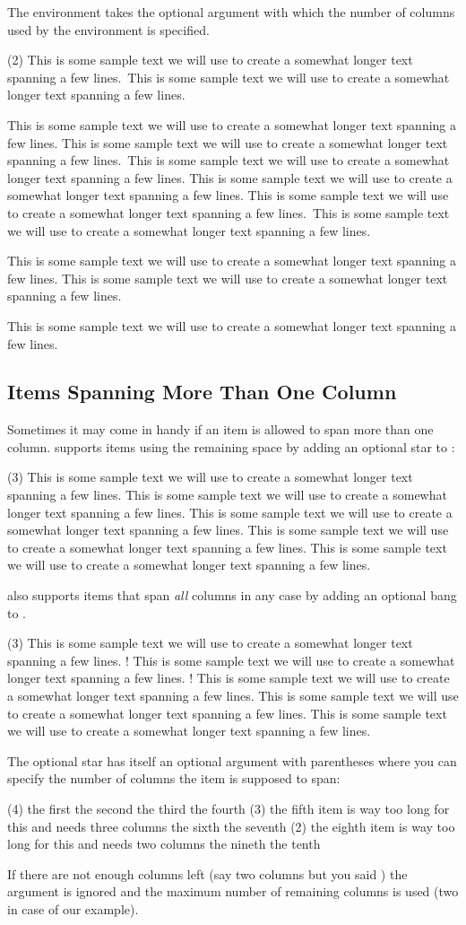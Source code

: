 \documentclass[load-preamble+]{cnltx-doc}
\newcommand*\sample{This is some sample text we will use to create a somewhat
  longer text spanning a few lines.}
\newcommand*\Sample{\sample\ \sample\par\sample}
\begin{document}
The environment takes the optional argument  with which
the number of columns used by the environment is specified.
\begin{example}
  \begin{tasks}(2)
    \task \Sample
    \task \sample\ \sample
    \task \sample
    \task \Sample
    \task \sample\par\sample
  \end{tasks}
\end{example}

\subsection{Items Spanning More Than One Column}
Sometimes it may come in handy if an item is allowed to span more than one
column.  \Tasks{} supports items using the remaining space by
adding an optional\label{optional-star} star to :
\begin{example}
  \begin{tasks}(3)
    \task \sample
    \task* \sample
    \task* \sample
    \task \sample
    \task \sample
  \end{tasks}
\end{example}

\Tasks{} also supports items that span \emph{all} columns in
any case by adding an optional bang\label{optional-bang} to .
\begin{example}
  \begin{tasks}(3)
    \task \sample
    \task! \sample
    \task! \sample
    \task \sample
    \task \sample
  \end{tasks}
\end{example}

The optional star has itself an optional argument with parentheses where you
can specify the number of columns the item is supposed to span:\label{debug}
\begin{example}
  \begin{tasks}(4)
    \task the first
    \task the second
    \task the third
    \task the fourth
    \task*(3) the fifth item is way too long for this and needs three columns
    \task the sixth
    \task the seventh
    \task*(2) the eighth item is way too long for this and needs two columns
    \task the nineth
    \task the tenth
  \end{tasks}
\end{example}
If there are not enough columns left (say two columns but you said
\sarg{}) the argument is ignored and the maximum number of
remaining columns is used (two in case of our example).
\end{document}
